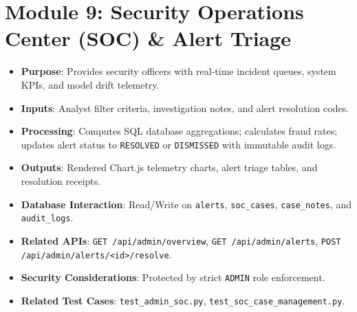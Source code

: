 \section{Module 9: Security Operations Center (SOC) \& Alert Triage}
\begin{itemize}
    \item \textbf{Purpose}: Provides security officers with real-time incident queues, system KPIs, and model drift telemetry.
    \item \textbf{Inputs}: Analyst filter criteria, investigation notes, and alert resolution codes.
    \item \textbf{Processing}: Computes SQL database aggregations; calculates fraud rates; updates alert status to \texttt{RESOLVED} or \texttt{DISMISSED} with immutable audit logs.
    \item \textbf{Outputs}: Rendered Chart.js telemetry charts, alert triage tables, and resolution receipts.
    \item \textbf{Database Interaction}: Read/Write on \texttt{alerts}, \texttt{soc\_cases}, \texttt{case\_notes}, and \texttt{audit\_logs}.
    \item \textbf{Related APIs}: \texttt{GET /api/admin/overview}, \texttt{GET /api/admin/alerts}, \texttt{POST /api/admin/alerts/<id>/resolve}.
    \item \textbf{Security Considerations}: Protected by strict \texttt{ADMIN} role enforcement.
    \item \textbf{Related Test Cases}: \texttt{test\_admin\_soc.py}, \texttt{test\_soc\_case\_management.py}.
\end{itemize}
